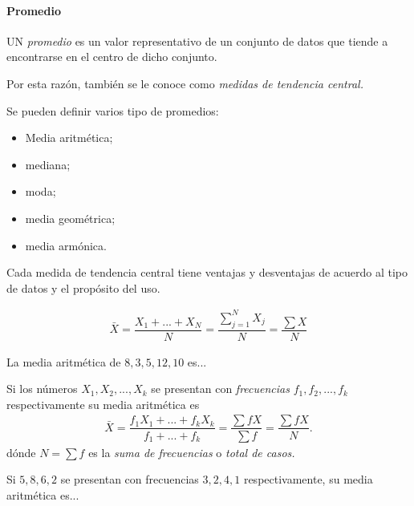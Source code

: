 \paragraph{Promedio}
UN \emph{promedio} es un valor representativo de un conjunto de datos que tiende a encontrarse en el centro de dicho conjunto. 

Por esta razón, también se le conoce como \emph{medidas de tendencia central.}



Se pueden definir varios tipo de promedios: 
\begin{itemize}
	\item Media aritmética;
	\item mediana;
	\item moda;
	\item media geométrica;
	\item media armónica.
\end{itemize}



\begin{observacion}
	Cada medida de tendencia central tiene ventajas y desventajas de acuerdo al tipo de datos y el propósito del uso.
\end{observacion}



\begin{definicion}
	\begin{align}
		\label{3.1}
		\bar{X} =\dfrac{X_{1}+...+X_{N}}{N} = \dfrac{\sum_{j=1}^{N}X_{j}}{N}=\dfrac{\sum X}{N}
	\end{align}
\end{definicion}



\begin{ejemplo}
	La media aritmética de $8,3,5,12,10$ es...
\end{ejemplo}



Si los números $X_{1},X_{2},...,X_{k}$ se presentan con \emph{frecuencias} $f_{1}, f_{2},...,f_{k}$ respectivamente su media aritmética es
\begin{align}
	\label{3.2}
	\bar{X}=\dfrac{f_{1}X_{1}+...+f_{k}X_{k}}{f_{1}+...+f_{k}}=\dfrac{\sum fX}{\sum f}=\dfrac{\sum fX}{N}.
\end{align}
dónde $N=\sum f$ es la \emph{suma de frecuencias} o \emph{total de casos.}


\begin{ejemplo}
	Si $5,8,6,2$ se presentan con frecuencias $3,2,4,1$ respectivamente, su media aritmética es...
\end{ejemplo}



